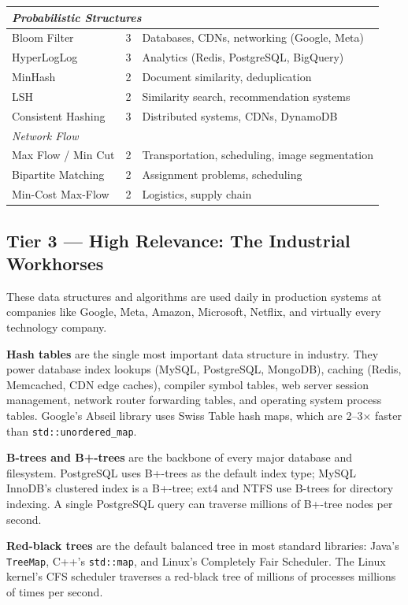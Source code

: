\begin{center}
\begin{tabular}{lcl}
\midrule
\multicolumn{3}{l}{\textit{Probabilistic Structures}} \\
\midrule
Bloom Filter & 3 & Databases, CDNs, networking (Google, Meta) \\
HyperLogLog & 3 & Analytics (Redis, PostgreSQL, BigQuery) \\
MinHash & 2 & Document similarity, deduplication \\
LSH & 2 & Similarity search, recommendation systems \\
Consistent Hashing & 3 & Distributed systems, CDNs, DynamoDB \\
\midrule
\multicolumn{3}{l}{\textit{Network Flow}} \\
\midrule
Max Flow / Min Cut & 2 & Transportation, scheduling, image segmentation \\
Bipartite Matching & 2 & Assignment problems, scheduling \\
Min-Cost Max-Flow & 2 & Logistics, supply chain \\
\midrule
\bottomrule
\end{tabular}
\end{center}


\subsection{Tier 3 --- High Relevance: The Industrial Workhorses}

These data structures and algorithms are used daily in production systems at companies like Google, Meta, Amazon, Microsoft, Netflix, and virtually every technology company.

\textbf{Hash tables} are the single most important data structure in industry. They power database index lookups (MySQL, PostgreSQL, MongoDB), caching (Redis, Memcached, CDN edge caches), compiler symbol tables, web server session management, network router forwarding tables, and operating system process tables. Google's Abseil library uses Swiss Table hash maps, which are 2--3$\times$ faster than \texttt{std::unordered\_map}.

\textbf{B-trees and B+-trees} are the backbone of every major database and filesystem. PostgreSQL uses B+-trees as the default index type; MySQL InnoDB's clustered index is a B+-tree; ext4 and NTFS use B-trees for directory indexing. A single PostgreSQL query can traverse millions of B+-tree nodes per second.

\textbf{Red-black trees} are the default balanced tree in most standard libraries: Java's \texttt{TreeMap}, C++'s \texttt{std::map}, and Linux's Completely Fair Scheduler. The Linux kernel's CFS scheduler traverses a red-black tree of millions of processes millions of times per second.

